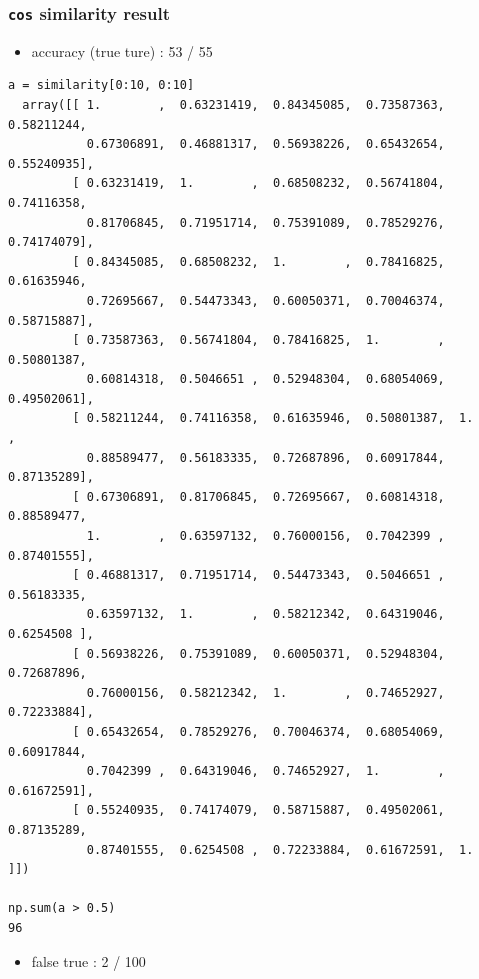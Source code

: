 \documentclass[11pt]{article}
\begin{document}
\subsubsection{\texttt{cos} similarity result}
\label{sec:orgheadline5}
\begin{itemize}
\item accuracy (true ture) : 53 / 55
\end{itemize}
\begin{verbatim}
a = similarity[0:10, 0:10]
  array([[ 1.        ,  0.63231419,  0.84345085,  0.73587363,  0.58211244,
           0.67306891,  0.46881317,  0.56938226,  0.65432654,  0.55240935],
         [ 0.63231419,  1.        ,  0.68508232,  0.56741804,  0.74116358,
           0.81706845,  0.71951714,  0.75391089,  0.78529276,  0.74174079],
         [ 0.84345085,  0.68508232,  1.        ,  0.78416825,  0.61635946,
           0.72695667,  0.54473343,  0.60050371,  0.70046374,  0.58715887],
         [ 0.73587363,  0.56741804,  0.78416825,  1.        ,  0.50801387,
           0.60814318,  0.5046651 ,  0.52948304,  0.68054069,  0.49502061],
         [ 0.58211244,  0.74116358,  0.61635946,  0.50801387,  1.        ,
           0.88589477,  0.56183335,  0.72687896,  0.60917844,  0.87135289],
         [ 0.67306891,  0.81706845,  0.72695667,  0.60814318,  0.88589477,
           1.        ,  0.63597132,  0.76000156,  0.7042399 ,  0.87401555],
         [ 0.46881317,  0.71951714,  0.54473343,  0.5046651 ,  0.56183335,
           0.63597132,  1.        ,  0.58212342,  0.64319046,  0.6254508 ],
         [ 0.56938226,  0.75391089,  0.60050371,  0.52948304,  0.72687896,
           0.76000156,  0.58212342,  1.        ,  0.74652927,  0.72233884],
         [ 0.65432654,  0.78529276,  0.70046374,  0.68054069,  0.60917844,
           0.7042399 ,  0.64319046,  0.74652927,  1.        ,  0.61672591],
         [ 0.55240935,  0.74174079,  0.58715887,  0.49502061,  0.87135289,
           0.87401555,  0.6254508 ,  0.72233884,  0.61672591,  1.        ]])

np.sum(a > 0.5)
96
\end{verbatim}
\begin{itemize}
\item false true : 2 / 100
\end{itemize}
\end{document}
